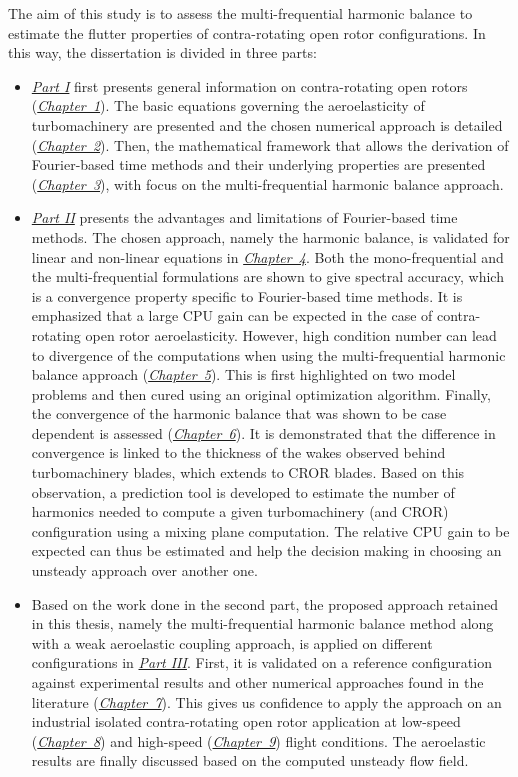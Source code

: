 The aim of this study is to assess the
multi-frequential harmonic balance
to estimate the flutter properties of contra-rotating open rotor
configurations. In this way, the dissertation is divided in three parts:
\begin{itemize}
	\item \hyperref[part1]{\emph{Part I}} first presents general information on 
	contra-rotating open rotors (\hyperref[cha:cror]{\emph{Chapter~1}}).
	The basic equations governing the aeroelasticity of
	turbomachinery are presented and the chosen numerical approach 
	is detailed (\hyperref[cha:ael]{\emph{Chapter~2}}).
	Then, the mathematical framework that allows the derivation
	of Fourier-based time methods and their underlying properties
	are presented (\hyperref[cha:spectral_methods]{\emph{Chapter~3}}),
	with focus on the multi-frequential harmonic balance approach.
	\item \hyperref[part2]{\emph{Part II}} 
	presents the advantages and limitations
	of Fourier-based time methods. The chosen approach, namely
	the harmonic balance, is validated for linear and non-linear
	equations in \hyperref[cha:validation_hb]{\emph{Chapter~4}}. Both the
	mono-frequential and the multi-frequential formulations
	are shown to give spectral accuracy, which is a convergence
	property specific to Fourier-based time methods.
	It is emphasized
	that a large CPU gain can be expected in the
	case of contra-rotating open rotor aeroelasticity. 
	However, high condition number can lead to divergence
	of the computations when using the multi-frequential harmonic
	balance approach
	(\hyperref[cha:limitations_condition_number]{\emph{Chapter~5}}). This is 
	first highlighted on two model problems and then cured using
	an original optimization algorithm.
	Finally, the convergence of the harmonic balance 
	that was shown to be case dependent is
	assessed (\hyperref[cha:limitations_convergence]{\emph{Chapter~6}}). 
	It is demonstrated that the difference in convergence
	is linked to the thickness of the wakes observed behind
	turbomachinery blades, which extends to CROR blades. Based on this observation,
	a prediction tool is developed to estimate the
	number of harmonics needed to compute a given turbomachinery (and CROR)
	configuration using a mixing plane computation. 
	The relative CPU gain to be expected can thus be estimated
	and help the decision making in choosing an unsteady approach
	over another one.
	\item Based on the work done in the second part,
	the proposed approach retained in this thesis, 
	namely the multi-frequential harmonic balance method along with a weak 
	aeroelastic coupling approach, is applied on different configurations
	in \hyperref[part3]{\emph{Part III}}. First, it is validated 
	on a reference configuration against experimental 
	results and other numerical approaches found in the literature
	(\hyperref[cha:stcf11]{\emph{Chapter~7}}). This gives us confidence
	to apply the approach on an industrial isolated contra-rotating
	open rotor application at low-speed (\hyperref[cha:dream_ls_isolated]{\emph{Chapter~8}})
	and high-speed (\hyperref[cha:dream_hs_isolated]{\emph{Chapter~9}})
	flight conditions. The aeroelastic results are finally discussed based
	on the computed unsteady flow field.
\end{itemize}
